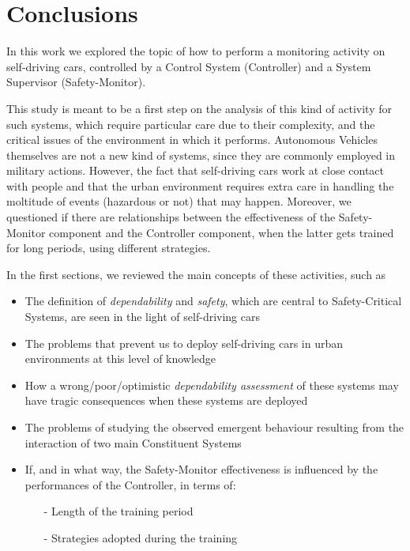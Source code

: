 \chapter{Conclusions}

In this work we explored the topic of how to perform a monitoring activity on self-driving cars, controlled by a Control System (Controller) and a System Supervisor (Safety-Monitor).

This study is meant to be a first step on the analysis of this kind of activity for such systems, which require particular care due to their complexity, and the critical issues of the environment in which it performs. Autonomous Vehicles themselves are not a new kind of systems, since they are commonly employed in military actions. However, the fact that self-driving cars work at close contact with people and that the urban environment requires extra care in handling the moltitude of events (hazardous or not) that may happen.
Moreover, we questioned if there are relationships between the effectiveness of the Safety-Monitor component and the Controller component, when the latter gets trained for long periods, using different strategies.

In the first sections, we reviewed the main concepts of these activities, such as

\begin{itemize}
	\item The definition of \textsl{dependability} and \textsl{safety}, which are central to Safety-Critical Systems, are seen in the light of self-driving cars
	\item The problems that prevent us to deploy self-driving cars in urban environments at this level of knowledge
	\item How a wrong/poor/optimistic \textsl{dependability assessment} of these systems may have tragic consequences when these systems are deployed
	\item The problems of studying the observed emergent behaviour resulting from the interaction of two main Constituent Systems
	\item If, and in what way, the Safety-Monitor effectiveness is influenced by the performances of the Controller, in terms of:
	\begin{itemize}
		\item[-] Length of the training period
		\item[-] Strategies adopted during the training
	\end{itemize}
\end{itemize}

